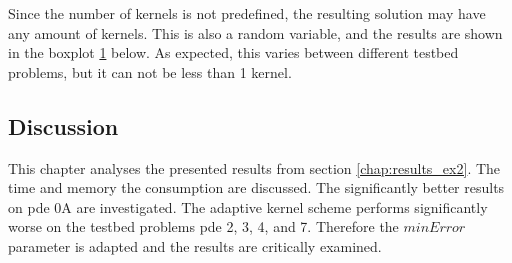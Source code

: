 \documentclass[./\jobname.tex]{subfiles}
\begin{document}
Since the number of kernels is not predefined, the resulting solution may have any amount of kernels. This is also a random variable, and the results are shown in the boxplot \ref{fig:pajade_kernels_boxplot} below. As expected, this varies between different testbed problems, but it can not be less than 1 kernel. 

\begin{figure}[H]
	\centering
	\noindent{}
	\label{fig:pajade_kernels_boxplot}
\end{figure}


\subsection{Discussion}

This chapter analyses the presented results from section \ref{chap:results_ex2}. The time and memory the consumption are discussed. The significantly better results on \gls{pde} 0A are investigated. The adaptive kernel scheme performs significantly worse on the testbed problems \gls{pde} 2, 3, 4, and 7. Therefore the $minError$ parameter is adapted and the results are critically examined. 
\end{document}
